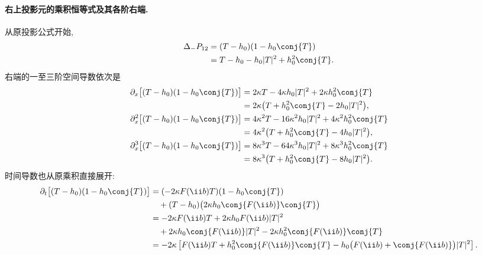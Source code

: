 \paragraph{右上投影元的乘积恒等式及其各阶右端.}
从原投影公式开始,
\begin{align*}
\Delta_-P_{12}
&=(T-h_0)(1-h_0\conj{T})\\
&=T-h_0-h_0|T|^2+h_0^2\conj{T}.
\end{align*}
右端的一至三阶空间导数依次是
\begin{align*}
\partial_x\bigl[(T-h_0)(1-h_0\conj{T})\bigr]
&=2\kappa T-4\kappa h_0|T|^2
+2\kappa h_0^2\conj{T}\\
&=2\kappa\bigl(T+h_0^2\conj{T}-2h_0|T|^2\bigr),\\
\partial_x^2\bigl[(T-h_0)(1-h_0\conj{T})\bigr]
&=4\kappa^2T-16\kappa^2h_0|T|^2
+4\kappa^2h_0^2\conj{T}\\
&=4\kappa^2\bigl(T+h_0^2\conj{T}-4h_0|T|^2\bigr),\\
\partial_x^3\bigl[(T-h_0)(1-h_0\conj{T})\bigr]
&=8\kappa^3T-64\kappa^3h_0|T|^2
+8\kappa^3h_0^2\conj{T}\\
&=8\kappa^3\bigl(T+h_0^2\conj{T}-8h_0|T|^2\bigr).
\end{align*}
时间导数也从原乘积直接展开:
\begin{align*}
\partial_t\bigl[(T-h_0)(1-h_0\conj{T})\bigr]
&=(-2\kappa F(\ii b)T)(1-h_0\conj{T})\\
&\quad+(T-h_0)
\bigl(2\kappa h_0\conj{F(\ii b)}\conj{T}\bigr)\\
&=-2\kappa F(\ii b)T
+2\kappa h_0F(\ii b)|T|^2\\
&\quad+2\kappa h_0\conj{F(\ii b)}|T|^2
-2\kappa h_0^2\conj{F(\ii b)}\conj{T}\\
&=-2\kappa\left[
F(\ii b)T+h_0^2\conj{F(\ii b)}\conj{T}
-h_0\bigl(F(\ii b)+\conj{F(\ii b)}\bigr)|T|^2
\right].
\end{align*}

